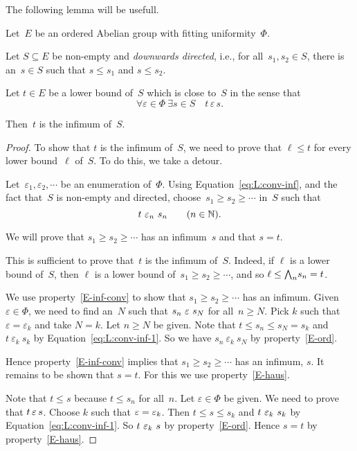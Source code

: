 \documentclass[main.tex]{subfiles}
\begin{document}
%
%
The following lemma will be usefull.
\begin{lem}
\label{lem:conv-inf}
Let~$E$ be an ordered Abelian group with 
fitting uniformity~$\Phi$.

Let $S\subseteq E$
be non-empty and \emph{downwards directed},
i.e., for all~$s_1,s_2\in S$,
there is an~$s\in S$ such that $s\leq s_1$
and $s\leq s_2$.

Let $t\in E$ be a lower bound of~$S$
which is close to~$S$ in the sense that
\begin{equation}
\label{eq:L:conv-inf}
\forall\varepsilon\in\Phi\ \exists s\in S\quad t\,\varepsilon\, s\text{.}
\end{equation}

Then~$t$ is the infimum of~$S$.
\end{lem}
\begin{proof}
To show that $t$ is the infimum of~$S$,
we need to prove that $\ell \leq t$
for every lower bound~$\ell$ of~$S$.
To do this, we take a detour.

Let~$\varepsilon_1,\varepsilon_2,\dotsb$
be an enumeration of~$\Phi$.
Using Equation~\eqref{eq:L:conv-inf},
and the fact that~$S$ is non-empty and directed,
choose~$s_1 \geq s_2 \geq \dotsb$ in~$S$
such that 
\begin{equation}
\label{eq:L:conv-inf-1}
t\ \varepsilon_n \ s_n\qquad(n\in \mathbb{N}).
\end{equation}

We will prove that
$s_1 \geq s_2 \geq \dotsb$
has an infimum~$s$ and that $s=t$.

This is sufficient to prove that~$t$ is the infimum of~$S$.
Indeed,
if $\ell$ is a lower bound of~$S$,
then $\ell$ is a lower bound of~$s_1 \geq s_2 \geq\dotsb$,
and so $\ell \leq \textstyle{\bigwedge}_n s_n =t$.

We use property~\ref{E-inf-conv}
to show that $s_1 \geq s_2 \geq\dotsb$
has an infimum.
Given $\varepsilon\in\Phi$,
we need to find an~$N$ such that $s_n \ \varepsilon\ s_N$
for all~$n\geq N$. Pick $k$ such that $\varepsilon=\varepsilon_k$
and take $N=k$. Let $n\geq N$ be given.
Note that $t \leq s_n \leq s_N =s_k$
and $t\ \varepsilon_k\ s_k$
by Equation~\eqref{eq:L:conv-inf-1}.
So we have $s_n\ \varepsilon_k\ s_N$ by property~\ref{E-ord}.

Hence property~\ref{E-inf-conv} implies that $s_1 \geq s_2 \geq \dotsb$
has an infimum, $s$.
It remains to be shown that $s=t$.
For this we use property~\ref{E-haus}.

Note that $t\leq s$ because $t\leq s_n$ for all~$n$.
Let $\varepsilon\in\Phi$ be given.
We need to prove that $t \,\varepsilon\, s$.
Choose $k$ such that $\varepsilon = \varepsilon_k$.
Then $t \leq s \leq s_k$
and $t \ \varepsilon_k\ s_k$
by Equation~\eqref{eq:L:conv-inf-1}.
So $t\ \varepsilon_k \  s$ by property~\ref{E-ord}.
Hence $s=t$ by property~\ref{E-haus}.
\end{proof}
\end{document}
